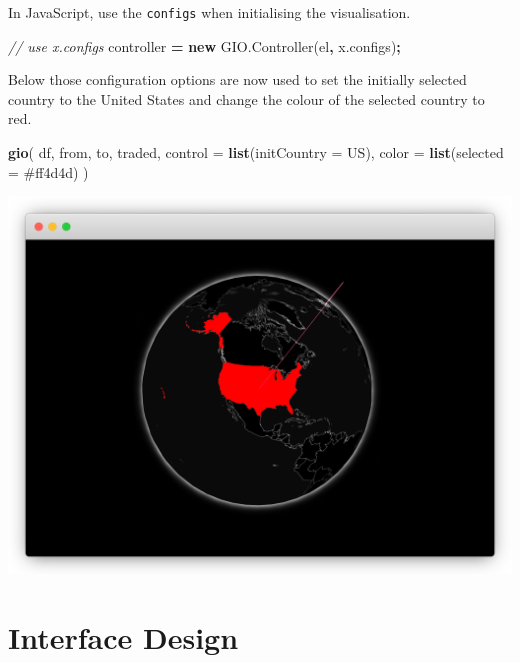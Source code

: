 \documentclass[
]{krantz}
\makeatletter
\newenvironment{Shaded}{\begin{snugshade}}{\end{snugshade}}
\newcommand{\AttributeTok}[1]{\textcolor[rgb]{0.61,0.61,0.61}{#1}}
\newcommand{\CommentTok}[1]{\textcolor[rgb]{0.37,0.37,0.37}{\textit{#1}}}
\newcommand{\DataTypeTok}[1]{\textcolor[rgb]{0.27,0.27,0.27}{#1}}
\newcommand{\KeywordTok}[1]{\textcolor[rgb]{0.27,0.27,0.27}{\textbf{#1}}}
\newcommand{\NormalTok}[1]{#1}
\newcommand{\OperatorTok}[1]{\textcolor[rgb]{0.43,0.43,0.43}{\textbf{#1}}}
\newcommand{\StringTok}[1]{\textcolor[rgb]{0.5,0.5,0.5}{#1}}
\newcommand{\VariableTok}[1]{\textcolor[rgb]{0,0,0}{#1}}
\newenvironment{kframe}{%
\medskip{}
\setlength{\fboxsep}{.8em}
 \def\at@end@of@kframe{}%
 \ifinner\ifhmode%
  \def\at@end@of@kframe{\end{minipage}}%
  \begin{minipage}{\columnwidth}%
 \fi\fi%
 \def\FrameCommand##1{\hskip\@totalleftmargin \hskip-\fboxsep
 \colorbox{shadecolor}{##1}\hskip-\fboxsep
     \hskip-\linewidth \hskip-\@totalleftmargin \hskip\columnwidth}%
 \MakeFramed {\advance\hsize-\width
   \@totalleftmargin\z@ \linewidth\hsize
   \@setminipage}}%
 {\par\unskip\endMakeFramed%
 \at@end@of@kframe}
\renewenvironment{Shaded}{\begin{kframe}}{\end{kframe}}
\makeatother
\begin{document}
In JavaScript, use the \texttt{configs} when initialising the visualisation.

\begin{Shaded}
\begin{Highlighting}[]
\CommentTok{// use x.configs}
\NormalTok{controller }\OperatorTok{=} \KeywordTok{new} \VariableTok{GIO}\NormalTok{.}\AttributeTok{Controller}\NormalTok{(el}\OperatorTok{,} \VariableTok{x}\NormalTok{.}\AttributeTok{configs}\NormalTok{)}\OperatorTok{;}
\end{Highlighting}
\end{Shaded}

Below those configuration options are now used to set the initially selected country to the United States and change the colour of the selected country to red.

\begin{Shaded}
\begin{Highlighting}[]
\KeywordTok{gio}\NormalTok{(}
\NormalTok{  df, from, to, traded, }
  \DataTypeTok{control =} \KeywordTok{list}\NormalTok{(}\DataTypeTok{initCountry =} \StringTok{\textquotesingle{}US\textquotesingle{}}\NormalTok{), }
  \DataTypeTok{color =} \KeywordTok{list}\NormalTok{(}\DataTypeTok{selected =} \StringTok{\textquotesingle{}\#ff4d4d\textquotesingle{}}\NormalTok{)}
\NormalTok{) }
\end{Highlighting}
\end{Shaded}

\includegraphics{images/crosstalk-three-dots.png}

\hypertarget{widgets-final-interface}{%
\section{Interface Design}\label{widgets-final-interface}}
\end{document}
